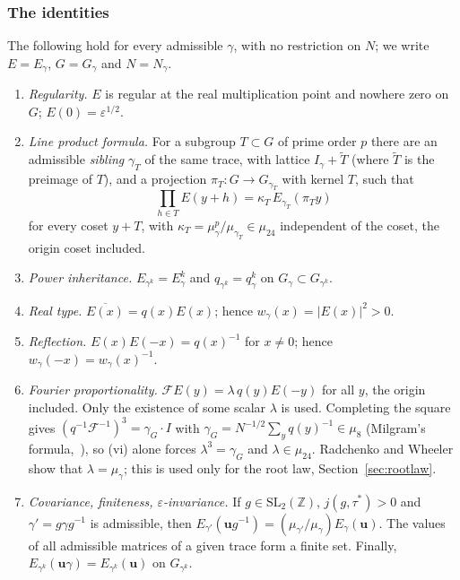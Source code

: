 \documentclass[11pt]{amsart}
\numberwithin{equation}{section}
\theoremstyle{plain}
\theoremstyle{definition}
\theoremstyle{remark}
\begin{document}
\subsubsection*{The identities}
The following hold for every admissible \(\gamma\), with no restriction on \(N\); we write \(E=E_\gamma\), \(G=G_\gamma\) and \(N=N_\gamma\).
\begin{enumerate}
\item[(i)] \emph{Regularity.} \(E\) is regular at the real multiplication point and nowhere zero on \(G\); \(E(0)=\varepsilon^{1/2}\).
\item[(ii)] \emph{Line product formula.} For a subgroup \(T\subset G\) of prime order \(p\) there are an admissible \emph{sibling} \(\gamma_T\) of the same trace, with lattice \(I_\gamma+\widetilde T\) (where \(\widetilde T\) is the preimage of \(T\)), and a projection \(\pi_T:G\to G_{\gamma_T}\) with kernel \(T\), such that
\[\prod_{h\in T}E(y+h)=\kappa_T\,E_{\gamma_T}(\pi_Ty)\]
for every coset \(y+T\), with \(\kappa_T=\mu_\gamma^p/\mu_{\gamma_T}\in\mu_{24}\) independent of the coset, the origin coset included.
\item[(iii)] \emph{Power inheritance.} \(E_{\gamma^k}=E_\gamma^k\) and \(q_{\gamma^k}=q_\gamma^k\) on \(G_\gamma\subset G_{\gamma^k}\).
\item[(iv)] \emph{Real type.} \(\overline{E(x)}=q(x)E(x)\); hence \(w_\gamma(x)=|E(x)|^2>0\).
\item[(v)] \emph{Reflection.} \(E(x)E(-x)=q(x)^{-1}\) for \(x\ne0\); hence \(w_\gamma(-x)=w_\gamma(x)^{-1}\).
\item[(vi)] \emph{Fourier proportionality.} \(\mathcal FE(y)=\lambda\,q(y)E(-y)\) for all \(y\), the origin included. Only the existence of some scalar \(\lambda\) is used. Completing the square gives \((q^{-1}\mathcal F^{-1})^3=\gamma_G\cdot I\) with \(\gamma_G=N^{-1/2}\sum_yq(y)^{-1}\in\mu_8\) (Milgram's formula,~\cite[Appendix~4]{MH}), so (vi) alone forces \(\lambda^3=\gamma_G\) and \(\lambda\in\mu_{24}\). Radchenko and Wheeler show that \(\lambda=\mu_\gamma\); this is used only for the root law, Section~\ref{sec:rootlaw}.
\item[(vii)] \emph{Covariance, finiteness, \(\varepsilon\)-invariance.} If \(g\in\mathrm{SL}_2(\mathbb Z)\), \(j(g,\tau^*)>0\) and \(\gamma'=g\gamma g^{-1}\) is admissible, then \(E_{\gamma'}(\mathbf ug^{-1})=(\mu_{\gamma'}/\mu_\gamma)E_\gamma(\mathbf u)\). The values of all admissible matrices of a given trace form a finite set. Finally, \(E_{\gamma^k}(\mathbf u\gamma)=E_{\gamma^k}(\mathbf u)\) on \(G_{\gamma^k}\).

\end{enumerate}
\end{document}
